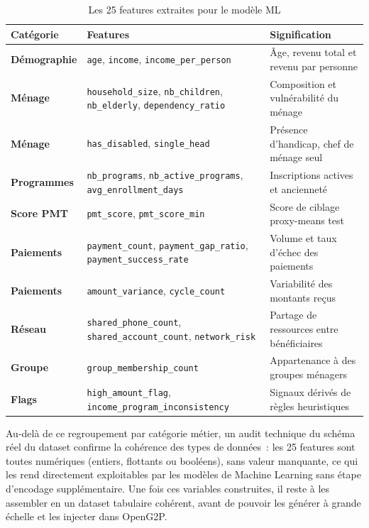 \documentclass[a4paper, oneside, 12pt]{book}
\newcommand{\thead}[1]{\cellcolor{EYdark}\textcolor{white}{\textbf{#1}}}
\renewcommand{\thead}[1]{\cellcolor{EYyellow}\textcolor{EYdark}{\textbf{#1}}}
\begin{document}
\begin{table}[H]
\centering
\caption{Les 25 features extraites pour le modèle ML}
\label{tab:features}
\renewcommand{\arraystretch}{1.3}
\begin{tabular}{>{\bfseries}p{2.5cm} p{5cm} p{6cm}}
\hline
\thead{Catégorie} & \thead{Features} & \thead{Signification} \\
\hline
\rowcolor{EYgray}
Démographie & \texttt{age}, \texttt{income}, \texttt{income\_per\_person} & Âge, revenu total et revenu par personne \\
Ménage & \texttt{household\_size}, \texttt{nb\_children}, \texttt{nb\_elderly}, \texttt{dependency\_ratio} & Composition et vulnérabilité du ménage \\
\rowcolor{EYgray}
Ménage & \texttt{has\_disabled}, \texttt{single\_head} & Présence d'handicap, chef de ménage seul \\
Programmes & \texttt{nb\_programs}, \texttt{nb\_active\_programs}, \texttt{avg\_enrollment\_days} & Inscriptions actives et ancienneté \\
\rowcolor{EYgray}
Score PMT & \texttt{pmt\_score}, \texttt{pmt\_score\_min} & Score de ciblage proxy-means test \\
Paiements & \texttt{payment\_count}, \texttt{payment\_gap\_ratio}, \texttt{payment\_success\_rate} & Volume et taux d'échec des paiements \\
\rowcolor{EYgray}
Paiements & \texttt{amount\_variance}, \texttt{cycle\_count} & Variabilité des montants reçus \\
Réseau & \texttt{shared\_phone\_count}, \texttt{shared\_account\_count}, \texttt{network\_risk} & Partage de ressources entre bénéficiaires \\
\rowcolor{EYgray}
Groupe & \texttt{group\_membership\_count} & Appartenance à des groupes ménagers \\
Flags & \texttt{high\_amount\_flag}, \texttt{income\_program\_inconsistency} & Signaux dérivés de règles heuristiques \\
\hline
\end{tabular}
\end{table}

\hspace{0.5cm}Au-delà de ce regroupement par catégorie métier, un audit technique du schéma réel du dataset confirme la cohérence des types de données~: les 25 features sont toutes numériques (entiers, flottants ou booléens), sans valeur manquante, ce qui les rend directement exploitables par les modèles de Machine Learning sans étape d'encodage supplémentaire. Une fois ces variables construites, il reste à les assembler en un dataset tabulaire cohérent, avant de pouvoir les générer à grande échelle et les injecter dans OpenG2P.
\end{document}
